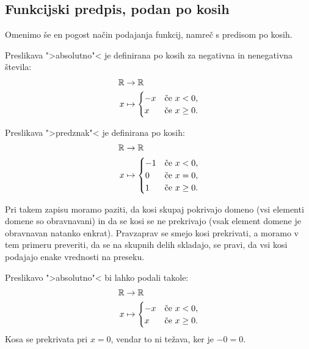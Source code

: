 \subsection{Funkcijski predpis, podan po kosih}

Omenimo še en pogost način podajanja funkcij, namreč s predisom po kosih.

\begin{primer}
  Preslikava ">absolutno"< je definirana po kosih za negativna in nenegativna števila:
  \begin{align*}
    \mathbb{R} &\to \mathbb{R} \\
    x &\mapsto
    \begin{cases}
      -x & \text{če $x < 0$,}\\
       x & \text{če $x \geq 0$.}
    \end{cases}
  \end{align*}
\end{primer}

\begin{primer}
  Preslikava ">predznak"< je definirana po kosih:
  \begin{align*}
    \mathbb{R} &\to \mathbb{R} \\
    x &\mapsto
      \begin{cases}
        -1 & \text{če $x < 0$,}\\
        0 & \text{če $x = 0$,}\\
        1 & \text{če $x \geq 0$.}
      \end{cases}
  \end{align*}
\end{primer}


Pri takem zapisu moramo paziti, da kosi skupaj pokrivajo domeno (vsi elementi domene so obravnavani) in da se kosi se ne prekrivajo (vsak element domene je obravnavan natanko enkrat). Pravzaprav se smejo kosi prekrivati, a moramo v tem primeru preveriti, da se na skupnih delih skladajo, se pravi, da vsi kosi podajajo enake vrednosti na preseku.

\begin{primer}
  Preslikavo ">absolutno"< bi lahko podali takole:
  \begin{align*}
    \mathbb{R} &\to \mathbb{R} \\
    x &\mapsto
    \begin{cases}
      -x & \text{če $x < 0$,}\\
       x & \text{če $x \geq 0$.}
    \end{cases}
  \end{align*}
  Kosa se prekrivata pri $x = 0$, vendar to ni težava, ker je $-0 = 0$.
\end{primer}


